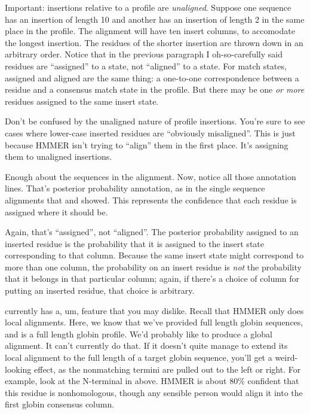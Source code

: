 Important: insertions relative to a profile are
\emph{unaligned}. Suppose one sequence has an insertion of length 10
and another has an insertion of length 2 in the same place in the
profile. The alignment will have ten insert columns, to accomodate the
longest insertion.  The residues of the shorter insertion are thrown
down in an arbitrary order.  Notice that in the previous paragraph I oh-so-carefully
said residues are ``assigned'' to a state, not ``aligned'' to a
state. For match states, assigned and aligned are the same thing: a
one-to-one correspondence between a residue and a consensus match
state in the profile. But there may be one \emph{or more} residues
assigned to the same insert state.

Don't be confused by the unaligned nature of profile 
insertions. You're sure to see cases where lower-case inserted
residues are ``obviously misaligned''.  This is just because HMMER
isn't trying to ``align'' them in the first place. It's assigning
them to unaligned insertions.

Enough about the sequences in the alignment. Now, notice all those
 annotation lines. That's posterior probability annotation,
as in the single sequence alignments that  and
 showed. This represents the confidence that each
residue is assigned where it should be.

Again, that's ``assigned'', not ``aligned''. The posterior probability
assigned to an inserted residue is the probability that it is assigned
to the insert state corresponding to that column. Because the same
insert state might correspond to more than one column, the probability
on an insert residue is \emph{not} the probability that it belongs in
that particular column; again, if there's a choice of column for
putting an inserted residue, that choice is arbitrary.

 currently has a, um, feature that you may dislike.
Recall that HMMER only does local alignments. Here, we know that we've
provided full length globin sequences, and  is a full
length globin profile. We'd probably like  to produce a
global alignment. It can't currently do that. If it doesn't quite
manage to extend its local alignment to the full length of a target
globin sequence, you'll get a weird-looking effect, as the nonmatching
termini are pulled out to the left or right. For example, look at the
N-terminal  in  above. HMMER is about 80\%
confident that this residue is nonhomologous, though any sensible
person would align it into the first globin consensus column.

